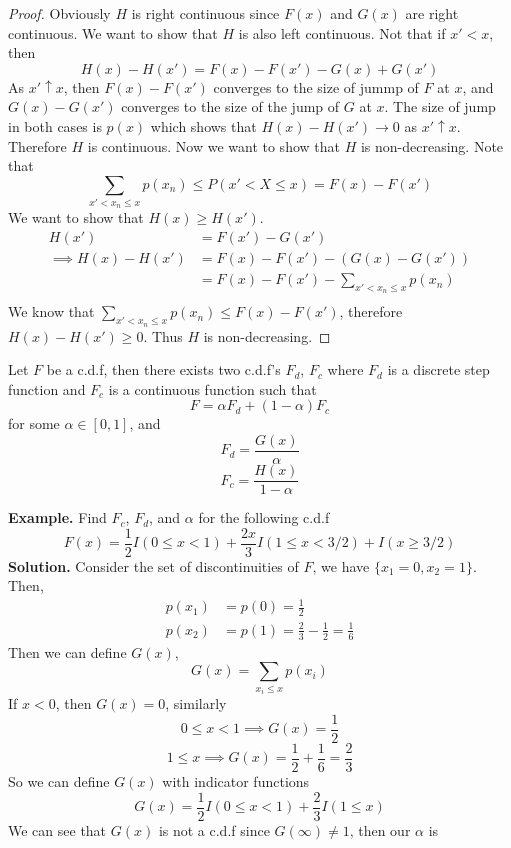 \documentclass[openany]{report}
\begin{document}
\begin{proof}
    Obviously $H$ is right continuous since $F(x)$ and $G(x)$ are right continuous. We want to show that $H$ is also left continuous. Not that if $x' < x$, then 
    \[H(x) - H(x') = F(x) - F(x') - G(x) + G(x')\]
    As $x' \uparrow x$, then $F(x) - F(x')$ converges to the size of jummp of $F$ at $x$, and $G(x) - G(x')$ converges to the size of the jump of $G$ at $x$. The size of jump in both cases is $p(x)$ which shows that $H(x) - H(x') \rightarrow 0$ as $x'\uparrow x$. Therefore $H$ is continuous. Now we want to show that $H$ is non-decreasing. Note that
    \[\sum_{x' < x_n \leq x} p(x_n)\leq P(x' < X \leq x) = F(x) - F(x')\]
    We want to show that $H(x) \geq H(x')$.
    \begin{align*}
        H(x') &= F(x') - G(x')\\
        \implies H(x) - H(x') &= F(x) - F(x') - (G(x) - G(x'))\\
        &= F(x) - F(x') - \sum_{x' < x_n \leq x} p(x_n)\\ 
    \end{align*}    
    We know that $\sum\limits_{x' < x_n \leq x} p(x_n) \leq F(x) - F(x')$, therefore $H(x) - H(x') \geq 0$. Thus $H$ is non-decreasing. 
\end{proof}
\begin{theorem}
    Let $F$ be a c.d.f, then there exists two c.d.f's $F_d$, $F_c$ where $F_d$ is a discrete step function and $F_c$ is a continuous function such that
    \[F = \alpha F_d + (1- \alpha)F_c\]
    for some $\alpha \in [0,1]$, and 
    \[F_d = \frac{G(x)}{\alpha}\]
    \[F_c = \frac{H(x)}{1 - \alpha}\]
\end{theorem}
\noindent
\textbf{Example.} Find $F_c$, $F_d$, and $\alpha$ for the following c.d.f
\[F(x) = \frac{1}{2}I(0 \leq x < 1) + \frac{2x}{3}I(1 \leq x < 3/2) + I(x \geq 3/2)\]
\textbf{Solution.} Consider the set of discontinuities of $F$, we have $\{x_1 = 0, x_2 = 1\}$. Then,
\begin{align*}
    p(x_1) &= p(0) = \frac{1}{2}\\
    p(x_2) &= p(1) = \frac{2}{3} - \frac{1}{2} = \frac{1}{6}
\end{align*}
Then we can define $G(x)$, 
\[G(x) = \sum_{x_i \leq x} p(x_i)\]
If $x < 0$, then $G(x) = 0$, similarly 
\[0 \leq x < 1 \implies G(x) = \frac{1}{2}\]
\[1 \leq x \implies G(x) = \frac{1}{2} + \frac{1}{6} = \frac{2}{3}\]
So we can define $G(x)$ with indicator functions 
\[G(x) = \frac{1}{2}I(0 \leq x < 1) + \frac{2}{3}I(1 \leq x)\]
We can see that $G(x)$ is not a c.d.f since $G(\infty) \neq 1$, then our $\alpha$ is 
\end{document}

